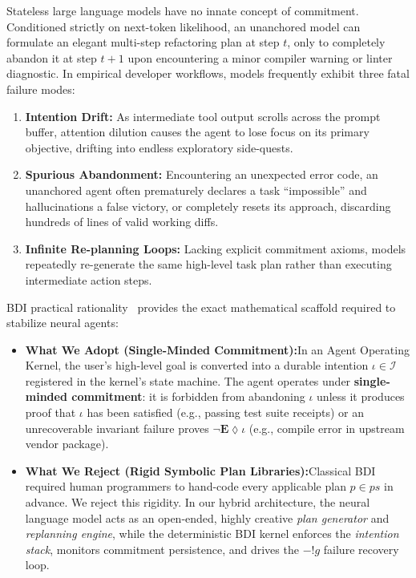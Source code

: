 Stateless large language models have no innate concept of commitment. Conditioned strictly on next-token likelihood, an unanchored model can formulate an elegant multi-step refactoring plan at step $t$, only to completely abandon it at step $t+1$ upon encountering a minor compiler warning or linter diagnostic. In empirical developer workflows, models frequently exhibit three fatal failure modes:
\begin{enumerate}[leftmargin=1.8em,itemsep=2pt]
  \item \textbf{Intention Drift:} As intermediate tool output scrolls across the prompt buffer, attention dilution causes the agent to lose focus on its primary objective, drifting into endless exploratory side-quests.
  \item \textbf{Spurious Abandonment:} Encountering an unexpected error code, an unanchored agent often prematurely declares a task ``impossible'' and hallucinations a false victory, or completely resets its approach, discarding hundreds of lines of valid working diffs.
  \item \textbf{Infinite Re-planning Loops:} Lacking explicit commitment axioms, models repeatedly re-generate the same high-level task plan rather than executing intermediate action steps.
\end{enumerate}

BDI practical rationality~ provides the exact mathematical scaffold required to stabilize neural agents:
\begin{itemize}[leftmargin=1.8em,itemsep=2pt]
  \item \textbf{What We Adopt (Single-Minded Commitment):}\enspace In an Agent Operating Kernel, the user's high-level goal is converted into a durable intention $\iota \in \mathcal{I}$ registered in the kernel's state machine. The agent operates under \textbf{single-minded commitment}: it is forbidden from abandoning $\iota$ unless it produces proof that $\iota$ has been satisfied (e.g., passing test suite receipts) or an unrecoverable invariant failure proves $\neg\mathbf{E}\lozenge \iota$ (e.g., compile error in upstream vendor package).
  \item \textbf{What We Reject (Rigid Symbolic Plan Libraries):}\enspace Classical BDI required human programmers to hand-code every applicable plan $p \in ps$ in advance. We reject this rigidity. In our hybrid architecture, the neural language model acts as an open-ended, highly creative \emph{plan generator} and \emph{replanning engine}, while the deterministic BDI kernel enforces the \emph{intention stack}, monitors commitment persistence, and drives the $-!g$ failure recovery loop.
\end{itemize}

